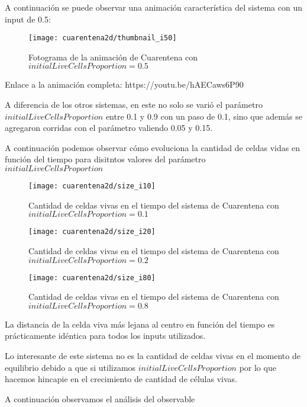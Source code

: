 A continuación se puede observar una animación característica del sistema con un input de 0.5:

\begin{figure}[H]
    \centering
    \texttt{[image: cuarentena2d/thumbnail\_i50]}
    \caption{Fotograma de la animación de Cuarentena con $initialLiveCellsProportion = 0.5$}
    \label{fig:thumbnailcuarentena2d_i50}
\end{figure}

Enlace a la animación completa: https://youtu.be/hAECaws6P90

A diferencia de los otros sistemas, en este no solo se varió el parámetro $initialLiveCellsProportion$ entre 0.1 y 0.9 con un paso de 0.1, 
sino que además se agregaron corridas con el parámetro valiendo 0.05 y 0.15.

A continuación podemos observar cómo evoluciona la cantidad de celdas vidas en función del tiempo para disitntos valores del parámetro $initialLiveCellsProportion$

\begin{figure}[H]
    \centering
    \texttt{[image: cuarentena2d/size\_i10]}
    \caption{Cantidad de celdas vivas en el tiempo del sistema de Cuarentena con $initialLiveCellsProportion = 0.1$}
    \label{fig:cuarentena2d_i10}
\end{figure}
\begin{figure}[H]
    \centering
    \texttt{[image: cuarentena2d/size\_i20]}
    \caption{Cantidad de celdas vivas en el tiempo del sistema de Cuarentena con $initialLiveCellsProportion = 0.2$}
    \label{fig:cuarentena2d_i20}
\end{figure}
\begin{figure}[H]
    \centering
    \texttt{[image: cuarentena2d/size\_i80]}
    \caption{Cantidad de celdas vivas en el tiempo del sistema de Cuarentena con $initialLiveCellsProportion = 0.8$}
    \label{fig:cuarentena2d_i80}
\end{figure}

La distancia de la celda viva más lejana al centro en función del tiempo es prácticamente idéntica para todos los inputs utilizados.

Lo interesante de este sistema no es la cantidad de celdas vivas en el momento de equilibrio debido a que si utilizamos $initialLiveCellsProportion$
por lo que hacemos hincapie en el crecimiento de cantidad de células vivas.

A continuación observamos el análisis del observable

